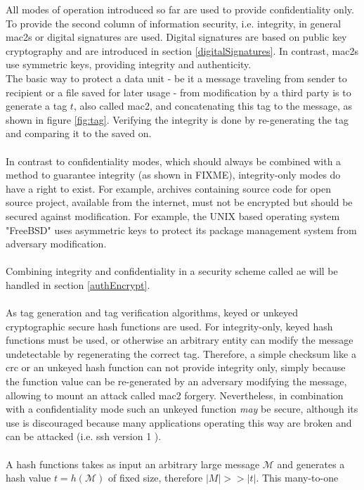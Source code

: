 All modes of operation introduced so far are used to provide confidentiality only. To provide the second column of information security, i.e. integrity, in general
\glspl{mac2} or digital signatures are used.
Digital signatures are based on public key cryptography and are introduced in section \ref{digitalSignatures}. In contrast, \glspl{mac2} use symmetric keys,
providing integrity and authenticity. 
\\
The basic way to protect a data unit - be it a message traveling from sender to recipient or a file saved for later usage - from modification by a third party is to
generate a tag $t$, also called \gls{mac2}, and concatenating this tag to the message, as shown in figure \ref{fig:tag}.
Verifying the integrity is done by re-generating the tag and comparing it to the saved on. 
\\
\\
In contrast to confidentiality modes, which should always be combined with a method to guarantee integrity (as shown in FIXME), 
integrity-only modes do have a right to exist. For example, archives containing source code for open source project, available from the internet, must not be
encrypted but should be secured against modification. For example, the UNIX based operating system "FreeBSD" uses asymmetric keys to protect its package
management system from adversary modification.
\\
\\
Combining integrity and confidentiality in a security scheme called \gls{ae} will be handled in section \ref{authEncrypt}.
\\
\\
As tag generation and tag verification algorithms, keyed or unkeyed cryptographic secure hash functions are used.
For integrity-only, keyed hash functions must be used, or
otherwise an arbitrary entity can modify the message undetectable by regenerating the correct tag. Therefore, a simple checksum like a \gls{crc} or an unkeyed 
hash function can not provide integrity only, simply because the function value can be re-generated by an adversary modifying the message, allowing to mount
an attack called \gls{mac2} forgery.
Nevertheless, in combination with a confidentiality mode such an unkeyed function \textit{may} be secure, although its use is discouraged because many applications operating
this way are broken and can be attacked (i.e. \gls{ssh} version 1 \cite{zalewskissh}).
\\
\\
A hash functions takes as input an arbitrary large message $\mathcal{M}$ and generates a hash value $t = h(\mathcal{M})$ of fixed size, therefore $|M| >> |t|$. This many-to-one
